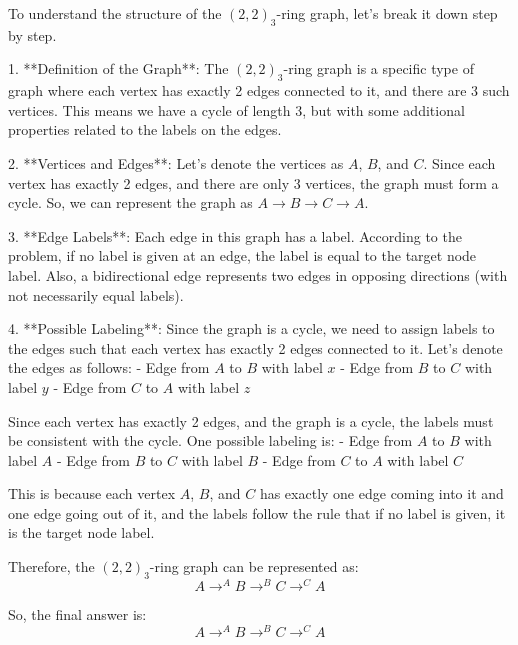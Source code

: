 To understand the structure of the \((2,2)_3\)-ring graph, let's break it down step by step.

1. **Definition of the Graph**: The \((2,2)_3\)-ring graph is a specific type of graph where each vertex has exactly 2 edges connected to it, and there are 3 such vertices. This means we have a cycle of length 3, but with some additional properties related to the labels on the edges.

2. **Vertices and Edges**: Let's denote the vertices as \(A\), \(B\), and \(C\). Since each vertex has exactly 2 edges, and there are only 3 vertices, the graph must form a cycle. So, we can represent the graph as \(A \rightarrow B \rightarrow C \rightarrow A\).

3. **Edge Labels**: Each edge in this graph has a label. According to the problem, if no label is given at an edge, the label is equal to the target node label. Also, a bidirectional edge represents two edges in opposing directions (with not necessarily equal labels).

4. **Possible Labeling**: Since the graph is a cycle, we need to assign labels to the edges such that each vertex has exactly 2 edges connected to it. Let's denote the edges as follows:
   - Edge from \(A\) to \(B\) with label \(x\)
   - Edge from \(B\) to \(C\) with label \(y\)
   - Edge from \(C\) to \(A\) with label \(z\)

Since each vertex has exactly 2 edges, and the graph is a cycle, the labels must be consistent with the cycle. One possible labeling is:
   - Edge from \(A\) to \(B\) with label \(A\)
   - Edge from \(B\) to \(C\) with label \(B\)
   - Edge from \(C\) to \(A\) with label \(C\)

This is because each vertex \(A\), \(B\), and \(C\) has exactly one edge coming into it and one edge going out of it, and the labels follow the rule that if no label is given, it is the target node label.

Therefore, the \((2,2)_3\)-ring graph can be represented as:
\[ A \rightarrow^A B \rightarrow^B C \rightarrow^C A \]

So, the final answer is:
\[
\boxed{A \rightarrow^A B \rightarrow^B C \rightarrow^C A}
\]